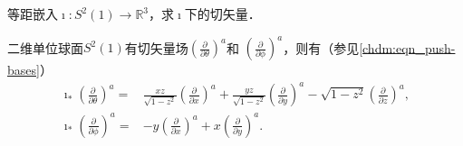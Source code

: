 \begin{example}\label{chsm:exm_Dni}
    等距嵌入$\imath:S^2(1) \to \mathbb{R}^3$，求$\imath$下的切矢量．
\end{example}
二维单位球面$S^2(1)$有切矢量场$(\frac{\partial }{\partial \theta})^a$和
$(\frac{\partial }{\partial \phi})^a$，则有（参见\eqref{chdm:eqn_push-bases}）
\begin{align}
    \imath_{*} \left(\frac{\partial }{\partial \theta}\right)^a 
    =& \frac{xz}{\sqrt{1-z^2}} \left(\frac{\partial }{\partial x}\right)^a
    + \frac{yz}{\sqrt{1-z^2}} \left(\frac{\partial }{\partial y}\right)^a
    - \sqrt{1-z^2} \left(\frac{\partial }{\partial z}\right)^a, \label{chsm:eqn_itheta} \\
    \imath_{*} \left(\frac{\partial }{\partial \phi}\right)^a 
    =&- y \left(\frac{\partial }{\partial x}\right)^a
    + x \left(\frac{\partial }{\partial y}\right)^a . \label{chsm:eqn_iphi}
\end{align}

